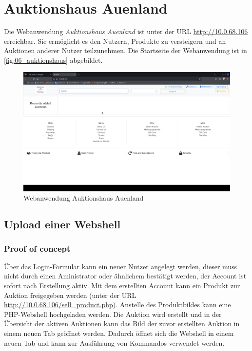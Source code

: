 \pagebreak
\chapter{Auktionshaus Auenland}
Die Webanwendung \textit{Auktionshaus Auenland} ist unter der URL \url{http://10.0.68.106} erreichbar. Sie ermöglicht es den Nutzern, Produkte zu versteigern und an Auktionen anderer Nutzer teilzunehmen. Die Startseite der Webanwendung ist in \autoref{fig:06_auktionshaus} abgebildet.

\vfill
\begin{figure}[!ht]
    \centering
    \includegraphics[width=\linewidth]{images/screenshots/08_auktionshaus.png}
    \caption{Webanwendung Auktionshaus Auenland}
    \label{fig:06_auktionshaus}
\end{figure}
\vfill
\newpage


\section{\makecvssbadge Upload einer Webshell}

\subsection*{Proof of concept}
Über das Login-Formular kann ein neuer Nutzer angelegt werden, dieser muss nicht durch einen Aministrator oder ähnlichem bestätigt werden, der Account ist sofort nach Erstellung aktiv. Mit dem erstellten Account kann ein Produkt zur Auktion freigegeben werden (unter der URL \url{http://10.0.68.106/sell_product.php}). Anstelle des Produktbildes kann eine PHP-Webshell hochgeladen werden. Die Auktion wird erstellt und in der Übersicht der aktiven Auktionen kann das Bild der zuvor erstellten Auktion in einem neuen Tab geöffnet werden. Dadurch öffnet sich die Webshell in einem neuen Tab und kann zur Ausführung von Kommandos verwendet werden.

